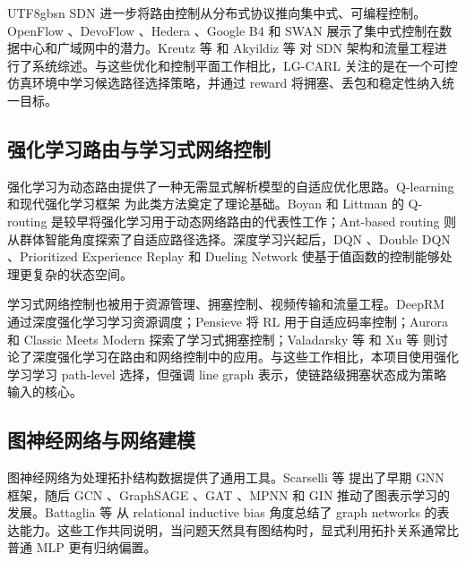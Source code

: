 \documentclass[9pt,a4paper,twocolumn,twoside]{rho-class/rho}
\begin{document}
\begin{CJK*}{UTF8}{gbsn}
SDN 进一步将路由控制从分布式协议推向集中式、可编程控制。OpenFlow \cite{mckeown2008openflow}、DevoFlow \cite{curtis2011devoflow}、Hedera \cite{alfares2010hedera}、Google B4 \cite{jain2013b4} 和 SWAN \cite{hong2013swan} 展示了集中式控制在数据中心和广域网中的潜力。Kreutz 等 \cite{kreutz2015sdn} 和 Akyildiz 等 \cite{akyildiz2014roadmap} 对 SDN 架构和流量工程进行了系统综述。与这些优化和控制平面工作相比，LG-CARL 关注的是在一个可控仿真环境中学习候选路径选择策略，并通过 reward 将拥塞、丢包和稳定性纳入统一目标。

\subsection{强化学习路由与学习式网络控制}

强化学习为动态路由提供了一种无需显式解析模型的自适应优化思路。Q-learning \cite{watkins1992qlearning} 和现代强化学习框架 \cite{sutton2018reinforcement} 为此类方法奠定了理论基础。Boyan 和 Littman 的 Q-routing \cite{boyan1993packet} 是较早将强化学习用于动态网络路由的代表性工作；Ant-based routing \cite{schoonderwoerd1996ant,dicaro1998antnet} 则从群体智能角度探索了自适应路径选择。深度学习兴起后，DQN \cite{mnih2015human}、Double DQN \cite{vanhasselt2016deep}、Prioritized Experience Replay \cite{schaul2016prioritized} 和 Dueling Network \cite{wang2016dueling} 使基于值函数的控制能够处理更复杂的状态空间。

学习式网络控制也被用于资源管理、拥塞控制、视频传输和流量工程。DeepRM \cite{mao2016resource} 通过深度强化学习学习资源调度；Pensieve \cite{mao2017neural} 将 RL 用于自适应码率控制；Aurora \cite{jay2019deep} 和 Classic Meets Modern \cite{abbasloo2020classic} 探索了学习式拥塞控制；Valadarsky 等 \cite{valadarsky2017learning} 和 Xu 等 \cite{xu2018experience} 则讨论了深度强化学习在路由和网络控制中的应用。与这些工作相比，本项目使用强化学习学习 path-level 选择，但强调 line graph 表示，使链路级拥塞状态成为策略输入的核心。

\subsection{图神经网络与网络建模}

图神经网络为处理拓扑结构数据提供了通用工具。Scarselli 等 \cite{scarselli2009gnn} 提出了早期 GNN 框架，随后 GCN \cite{kipf2017semi}、GraphSAGE \cite{hamilton2017inductive}、GAT \cite{velickovic2018graph}、MPNN \cite{gilmer2017mpnn} 和 GIN \cite{xu2019powerful} 推动了图表示学习的发展。Battaglia 等 \cite{battaglia2018relational} 从 relational inductive bias 角度总结了 graph networks 的表达能力。这些工作共同说明，当问题天然具有图结构时，显式利用拓扑关系通常比普通 MLP 更有归纳偏置。


\end{CJK*}
\end{document}
